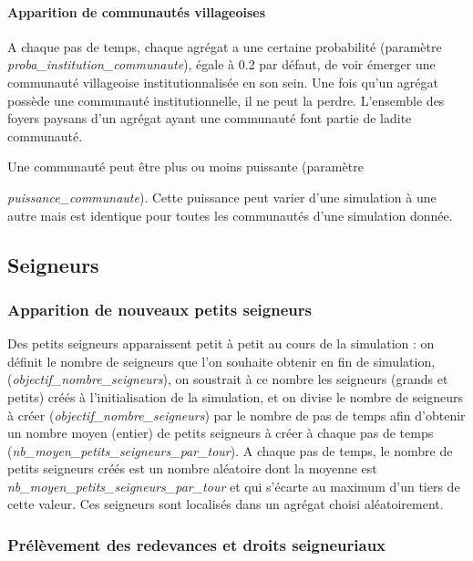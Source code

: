 \documentclass[a4paper,11pt]{article}
\begin{document}
\paragraph{Apparition de communautés villageoises}
\begin{sloppypar}
A chaque pas de temps, chaque agrégat a une certaine probabilité (paramètre \textit{proba\_institution\_communaute}), égale à 0.2 par défaut, de voir émerger une communauté villageoise institutionnalisée en son sein. Une fois qu'un agrégat possède une communauté institutionnelle, il ne peut la perdre.  L'ensemble des foyers paysans d'un agrégat ayant une communauté font partie de ladite communauté.
\end{sloppypar}

Une communauté peut être plus ou moins puissante (paramètre {\textit{puissance\_communaute}). Cette puissance peut varier d'une simulation à une autre mais est identique pour toutes les communautés d'une simulation donnée.

\subsection{Seigneurs}

\subsubsection{Apparition de nouveaux petits seigneurs}

Des petits seigneurs apparaissent petit à petit au cours de la simulation : on définit le nombre de seigneurs que l'on souhaite obtenir en fin de simulation, (\textit{objectif\_nombre\_seigneurs}), on soustrait à ce nombre les seigneurs (grands et petits) créés à l'initialisation de la simulation, et on divise le nombre de seigneurs à créer (\textit{objectif\_nombre\_seigneurs}) par le nombre de pas de temps afin d'obtenir un nombre moyen (entier) de petits seigneurs à  créer à chaque pas de temps (\textit{nb\_moyen\_petits\_seigneurs\_par\_tour}).
A chaque pas de temps, le nombre de petits seigneurs créés est un nombre aléatoire dont la moyenne est \textit{nb\_moyen\_petits\_seigneurs\_par\_tour} et qui s'écarte au maximum d'un tiers de cette valeur. Ces seigneurs sont localisés dans un agrégat choisi aléatoirement.


\subsubsection{Prélèvement des redevances et droits seigneuriaux}

}
\end{document}

